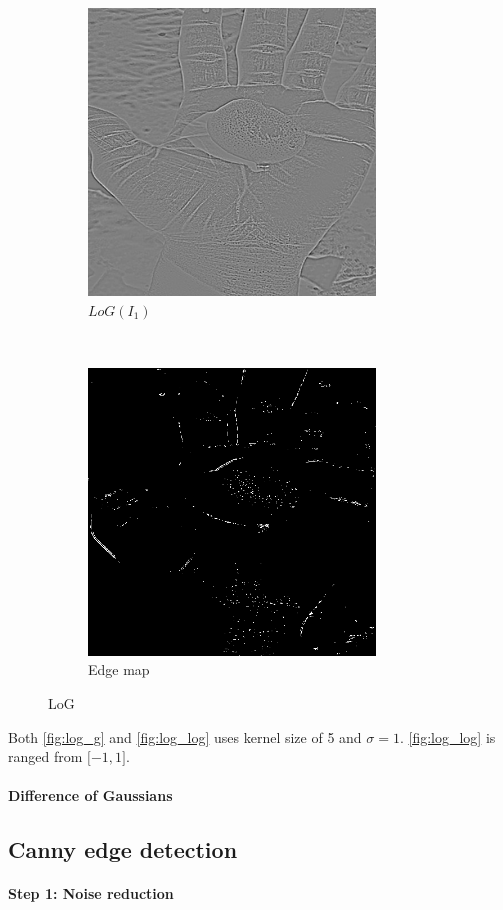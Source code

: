 \documentclass[12pt]{article}
\begin{document}
\begin{figure}[ht!]
\begin{subfigure}[t]{0.5\textwidth}
        \centering
        \includegraphics[height=3in]{images/log_log}
        \caption{$LoG(I_1)$}
        \label{fig:log_log}
    \end{subfigure}%
    ~
    \begin{subfigure}[t]{0.5\textwidth}
        \centering
        \includegraphics[height=3in]{images/log_edge}
        \caption{Edge map}
    \end{subfigure}
    \caption{LoG}
\end{figure}
Both \autoref{fig:log_g} and \autoref{fig:log_log} uses kernel size of 5 and $\sigma=1$. \autoref{fig:log_log} is ranged from $\lbrack -1, 1 \rbrack$. 

\paragraph*{Difference of Gaussians}

\subsection*{Canny edge detection}
\paragraph*{Step 1: Noise reduction}
\end{document}

